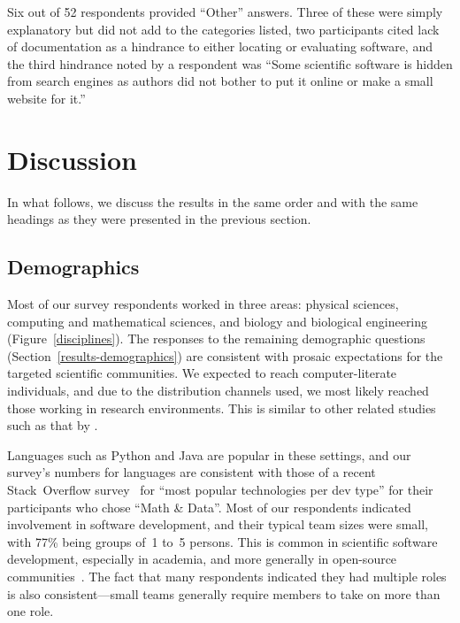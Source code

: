 \documentclass[review]{elsarticle}
\begin{document}
Six out of 52 respondents provided ``Other'' answers.  Three of these were simply explanatory but did not add to the categories listed, two participants cited lack of documentation as a hindrance to either locating or evaluating software, and the third hindrance noted by a respondent was ``Some scientific software is hidden from search engines as authors did not bother to put it online or make a small website for it.''

\clearpage


\section{Discussion}
\label{discussion}

In what follows, we discuss the results in the same order and with the same headings as they were presented in the previous section.

\subsection{Demographics}
\label{discussion-demographics}

Most of our survey respondents worked in three areas: physical sciences, computing and mathematical sciences, and biology and biological engineering (Figure~\ref{disciplines}). The responses to the remaining demographic questions (Section~\ref{results-demographics}) are consistent with prosaic expectations for the targeted scientific communities.  We expected to reach computer-literate individuals, and due to the distribution channels used, we most likely reached those working in research environments.  This is similar to other related studies such as that by \citet{lawrence2015science}.

Languages such as Python and Java are popular in these settings, and our survey's numbers for languages are consistent with those of a recent Stack~Overflow survey~\citep{stackexchange2016survey} for ``most popular technologies per dev type'' for their participants who chose ``Math \& Data''.  Most of our respondents indicated involvement in software development, and their typical team sizes were small, with 77\% being groups of~1 to~5 persons.  This is common in scientific software development, especially in academia, and more generally in open-source communities~\citep{sojer2010code}.  The fact that many respondents indicated they had multiple roles is also consistent---small teams generally require members to take on more than one role.
\end{document}

